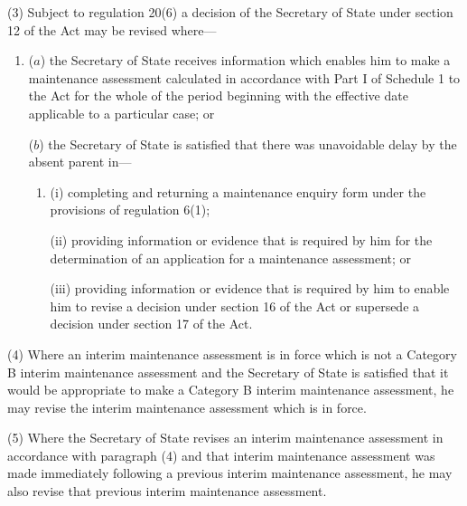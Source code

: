 \documentclass[a4paper,12pt]{article}
\begin{document}
(3) Subject to regulation 20(6) a decision of the Secretary of State under section 12 of the Act may be revised where---
\begin{enumerate}\item[]
($a$) the Secretary of State receives information which enables him to make a maintenance assessment calculated in accordance with Part I of Schedule 1 to the Act for the whole of the period beginning with the effective date applicable to a particular case; or

($b$) the Secretary of State is satisfied that there was unavoidable delay by the absent parent in---
\begin{enumerate}\item[]
(i) completing and returning a maintenance enquiry form under the provisions of regulation 6(1);

(ii) providing information or evidence that is required by him for the determination of an application for a maintenance assessment; or

(iii) providing information or evidence that is required by him to enable him to revise a decision under section 16 of the Act or supersede a decision under section 17 of the Act.
\end{enumerate}
\end{enumerate}

(4) Where an interim maintenance assessment is in force which is not a Category B interim maintenance assessment and the Secretary of State is satisfied that it would be appropriate to make a Category B interim maintenance assessment, he may revise the interim maintenance assessment which is in force.

(5) Where the Secretary of State revises an interim maintenance assessment in accordance with paragraph (4) and that interim maintenance assessment was made immediately following a previous interim maintenance assessment, he may also revise that previous interim maintenance assessment.
\end{document}
